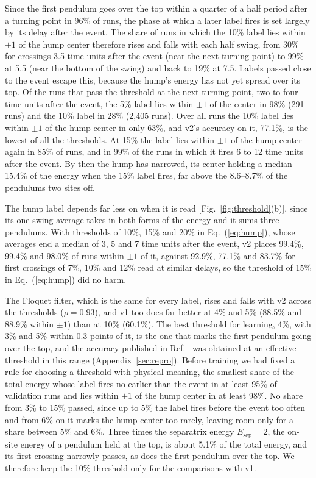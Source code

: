 \documentclass[11pt]{article}
\begin{document}
Since the first pendulum goes over the top within a quarter of a half period after a turning point in 96\% of runs, the phase at which a later label fires is set largely by its delay after the event. The share of runs in which the 10\% label lies within $\pm1$ of the hump center therefore rises and falls with each half swing, from 30\% for crossings 3.5 time units after the event (near the next turning point) to 99\% at 5.5 (near the bottom of the swing) and back to 19\% at 7.5. Labels passed close to the event escape this, because the hump's energy has not yet spread over its top. Of the runs that pass the threshold at the next turning point, two to four time units after the event, the 5\% label lies within $\pm1$ of the center in 98\% (291 runs) and the 10\% label in 28\% (2,405 runs). Over all runs the 10\% label lies within $\pm1$ of the hump center in only 63\%, and v2's accuracy on it, 77.1\%, is the lowest of all the thresholds. At 15\% the label lies within $\pm1$ of the hump center again in 85\% of runs, and in 99\% of the runs in which it fires 6 to 12 time units after the event. By then the hump has narrowed, its center holding a median 15.4\% of the energy when the 15\% label fires, far above the 8.6--8.7\% of the pendulums two sites off.

The hump label depends far less on when it is read [Fig.~\ref{fig:threshold}(b)], since its one-swing average takes in both forms of the energy and it sums three pendulums. With thresholds of 10\%, 15\% and 20\% in Eq.~(\ref{eq:hump}), whose averages end a median of 3, 5 and 7 time units after the event, v2 places 99.4\%, 99.4\% and 98.0\% of runs within $\pm1$ of it, against 92.9\%, 77.1\% and 83.7\% for first crossings of 7\%, 10\% and 12\% read at similar delays, so the threshold of 15\% in Eq.~(\ref{eq:hump}) did no harm.

The Floquet filter, which is the same for every label, rises and falls with v2 across the thresholds ($\rho=0.93$), and v1 too does far better at 4\% and 5\% (88.5\% and 88.9\% within $\pm1$) than at 10\% (60.1\%). The best threshold for learning, 4\%, with 3\% and 5\% within 0.3 points of it, is the one that marks the first pendulum going over the top, and the accuracy published in Ref.~\cite{mittal2026jand} was obtained at an effective threshold in this range (Appendix~\ref{sec:repro}). Before training we had fixed a rule for choosing a threshold with physical meaning, the smallest share of the total energy whose label fires no earlier than the event in at least 95\% of validation runs and lies within $\pm1$ of the hump center in at least 98\%. No share from 3\% to 15\% passed, since up to 5\% the label fires before the event too often and from 6\% on it marks the hump center too rarely, leaving room only for a share between 5\% and 6\%. Three times the separatrix energy $E_{\mathrm{sep}}=2$, the on-site energy of a pendulum held at the top, is about 5.1\% of the total energy, and its first crossing narrowly passes, as does the first pendulum over the top. We therefore keep the 10\% threshold only for the comparisons with v1.
\end{document}
